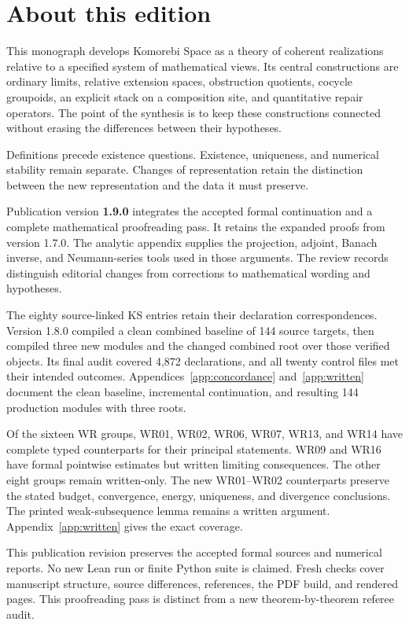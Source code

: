 \documentclass[11pt]{article}
\begin{document}
\KomorebiCover
{}
\section*{About this edition}
This monograph develops Komorebi Space as a theory of coherent realizations relative to a specified system of mathematical views. Its central constructions are ordinary limits, relative extension spaces, obstruction quotients, cocycle groupoids, an explicit stack on a composition site, and quantitative repair operators. The point of the synthesis is to keep these constructions connected without erasing the differences between their hypotheses.

Definitions precede existence questions. Existence, uniqueness, and numerical stability remain separate. Changes of representation retain the distinction between the new representation and the data it must preserve.

Publication version \textbf{1.9.0} integrates the accepted formal continuation and a complete mathematical proofreading pass. It retains the expanded proofs from version 1.7.0. The analytic appendix supplies the projection, adjoint, Banach inverse, and Neumann-series tools used in those arguments. The review records distinguish editorial changes from corrections to mathematical wording and hypotheses.

The eighty source-linked KS entries retain their declaration correspondences. Version 1.8.0 compiled a clean combined baseline of 144 source targets, then compiled three new modules and the changed combined root over those verified objects. Its final audit covered 4,872 declarations, and all twenty control files met their intended outcomes. Appendices~\ref{app:concordance} and~\ref{app:written} document the clean baseline, incremental continuation, and resulting 144 production modules with three roots.

Of the sixteen WR groups, WR01, WR02, WR06, WR07, WR13, and WR14 have complete typed counterparts for their principal statements. WR09 and WR16 have formal pointwise estimates but written limiting consequences. The other eight groups remain written-only. The new WR01--WR02 counterparts preserve the stated budget, convergence, energy, uniqueness, and divergence conclusions. The printed weak-subsequence lemma remains a written argument. Appendix~\ref{app:written} gives the exact coverage.

This publication revision preserves the accepted formal sources and numerical reports. No new Lean run or finite Python suite is claimed. Fresh checks cover manuscript structure, source differences, references, the PDF build, and rendered pages. This proofreading pass is distinct from a new theorem-by-theorem referee audit.
\end{document}
